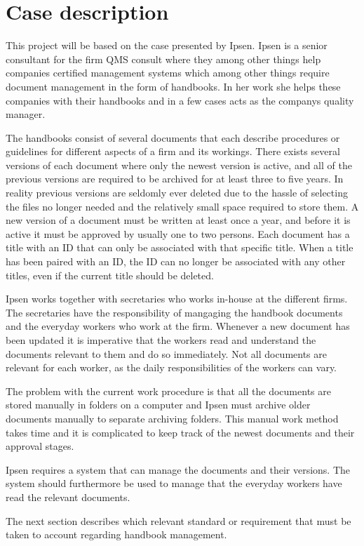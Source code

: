 \section{Case description} \label{sec:CaseDescription}

This project will be based on the case presented by Ipsen. 
Ipsen is a senior consultant for the firm QMS consult where they among other things help companies certified management systems which among other things require document management in the form of handbooks.
In her work she helps these companies with their handbooks and in a few cases acts as the companys quality manager.

The handbooks consist of several documents that each describe procedures or guidelines for different aspects of a firm and its workings.
There exists several versions of each document where only the newest version is active, and all of the previous versions are required to be archived for at least three to five years. 
In reality previous versions are seldomly ever deleted due to the hassle of selecting the files no longer needed and the relatively small space required to store them.
A new version of a document must be written at least once a year, and before it is active it must be approved by usually one to two persons.
Each document has a title with an ID that can only be associated with that specific title. 
When a title has been paired with an ID, the ID can no longer be associated with any other titles, even if the current title should be deleted.

Ipsen works together with secretaries who works in-house at the different firms.
The secretaries have the responsibility of mangaging the handbook documents and the everyday workers who work at the firm.
Whenever a new document has been updated it is imperative that the workers read and understand the documents relevant to them and do so immediately.
Not all documents are relevant for each worker, as the daily responsibilities of the workers can vary.

The problem with the current work procedure is that all the documents are stored manually in folders on a computer and Ipsen must archive older documents manually to separate archiving folders.
This manual work method takes time and it is complicated to keep track of the newest documents and their approval stages.

Ipsen requires a system that can manage the documents and their versions.
The system should furthermore be used to manage that the everyday workers have read the relevant documents. 

The next section describes which relevant standard or requirement that must be taken to account regarding handbook management. 
